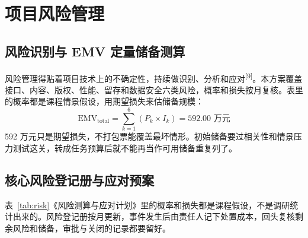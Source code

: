 \documentclass[UTF8,12pt,a4paper]{ctexart}
\begin{document}
\section{项目风险管理}

\subsection{风险识别与 EMV 定量储备测算}
风险管理得贴着项目技术上的不确定性，持续做识别、分析和应对\textsuperscript{[9]}。本方案覆盖接口、内容、版权、性能、留存和数据安全六类风险，概率和损失按月复核。表里的概率都是课程情景假设，用期望损失来估储备规模：
\begin{equation}
  \mathrm{EMV}_{\mathrm{total}} = \sum_{k=1}^{6} (P_k \times I_k) = 592.00\text{ 万元}
\end{equation}
592 万元只是期望损失，不打包票能覆盖最坏情形。初始储备要过相关性和情景压力测试这关，转成任务预算后就不能再当作可用储备重复列了。

\subsection{核心风险登记册与应对预案}
表~\ref{tab:risk}《风险测算与应对计划》里的概率和损失都是课程假设，不是调研统计出来的。风险登记册按月更新，事件发生后由责任人记下处置成本，回头复核剩余风险和储备，审批与关闭的记录都要留好。
\end{document}
